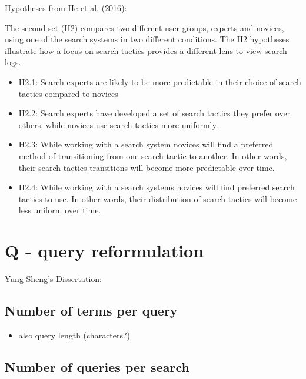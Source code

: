 \documentclass[letterpaper, nobind]{templates/ociamthesis}
\providecommand{\tightlist}{%
  \setlength{\itemsep}{0pt}\setlength{\parskip}{0pt}}
\begin{document}
Hypotheses from He et al. (\protect\hyperlink{ref-he2016beyond}{2016}):

The second set (H2) compares two different user groups, experts and novices, using one of the search systems in two different conditions. The H2 hypotheses illustrate how a focus on search tactics provides a different lens to view search logs.

\begin{itemize}
\tightlist
\item
  H2.1: Search experts are likely to be more predictable in their choice of search tactics compared to novices
\item
  H2.2: Search experts have developed a set of search tactics they prefer over others, while novices use search tactics more uniformly.
\item
  H2.3: While working with a search system novices will find a preferred method of transitioning from one search tactic to another. In other words, their search tactics transitions will become more predictable over time.
\item
  H2.4: While working with a search systems novices will find preferred search tactics to use. In other words, their distribution of search tactics will become less uniform over time.
\end{itemize}

\hypertarget{q---query-reformulation}{%
\section{Q - query reformulation}\label{q---query-reformulation}}

Yung Sheng's Dissertation:

\hypertarget{number-of-terms-per-query}{%
\subsection{Number of terms per query}\label{number-of-terms-per-query}}

\begin{itemize}
\tightlist
\item
  also query length (characters?)
\end{itemize}

\hypertarget{number-of-queries-per-search}{%
\subsection{Number of queries per search}\label{number-of-queries-per-search}}
\end{document}
